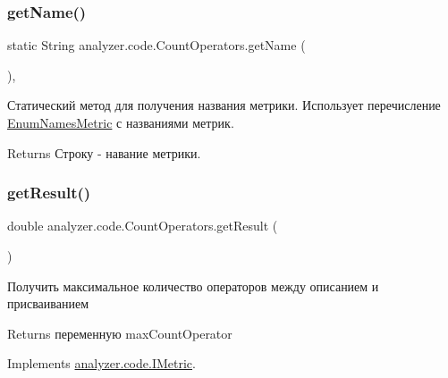 \subsubsection{\texorpdfstring{get\+Name()}{getName()}}
{\footnotesize\ttfamily static String analyzer.\+code.\+Count\+Operators.\+get\+Name (\begin{DoxyParamCaption}{ }\end{DoxyParamCaption})\hspace{0.3cm}{\ttfamily [inline]}, {\ttfamily [static]}}

Статический метод для получения названия метрики. Использует перечисление \hyperlink{enumanalyzer_1_1code_1_1EnumNamesMetric}{Enum\+Names\+Metric} с названиями метрик. \begin{DoxyReturn}{Returns}
Строку -\/ навание метрики. 
\end{DoxyReturn}
\mbox{\label{classanalyzer_1_1code_1_1CountOperators_ab5d3d7000eaaa974536c967ceee9dcc7}} 
\subsubsection{\texorpdfstring{get\+Result()}{getResult()}}
{\footnotesize\ttfamily double analyzer.\+code.\+Count\+Operators.\+get\+Result (\begin{DoxyParamCaption}{ }\end{DoxyParamCaption})\hspace{0.3cm}{\ttfamily [inline]}}

Получить максимальное количество операторов между описанием и присваиванием \begin{DoxyReturn}{Returns}
переменную max\+Count\+Operator 
\end{DoxyReturn}


Implements \hyperlink{interfaceanalyzer_1_1code_1_1IMetric}{analyzer.\+code.\+I\+Metric}.

\mbox{\label{classanalyzer_1_1code_1_1CountOperators_ad068949f06b712b55f12b03673a99278}} 
